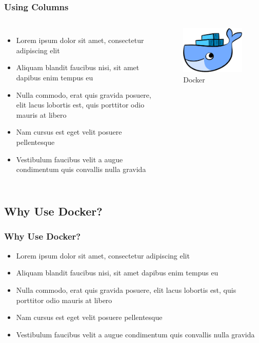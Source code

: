 \documentclass{beamer}
\begin{document}

\begin{frame}
    \frametitle{Using Columns}
    \begin{columns}
    \begin{itemize}

        \item Lorem ipsum dolor sit amet, consectetur adipiscing elit
        \item Aliquam blandit faucibus nisi, sit amet dapibus enim tempus eu
        \item Nulla commodo, erat quis gravida posuere, elit lacus lobortis est, quis porttitor odio mauris at libero
        \item Nam cursus est eget velit posuere pellentesque
        \item Vestibulum faucibus velit a augue condimentum quis convallis nulla gravida
    \end{itemize}
    \begin{figure}
    \includegraphics[scale=0.5]{./pics/docker.png}
    \caption{Docker}
    \end{figure}
    \end{columns}
\end{frame}

\subsection{Why Use Docker?} 
\begin{frame}
\frametitle{Why Use Docker?}
\begin{itemize}
\item Lorem ipsum dolor sit amet, consectetur adipiscing elit
\item Aliquam blandit faucibus nisi, sit amet dapibus enim tempus eu
\item Nulla commodo, erat quis gravida posuere, elit lacus lobortis est, quis porttitor odio mauris at libero
\item Nam cursus est eget velit posuere pellentesque
\item Vestibulum faucibus velit a augue condimentum quis convallis nulla gravida
\end{itemize}
\end{frame}
\end{document}
